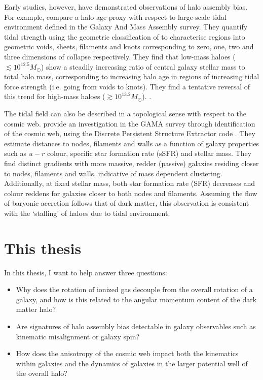 Early studies, however, have demonstrated observations of halo assembly bias. For example, \citet{tojeiro2017} compare a halo age proxy with respect to large-scale tidal environment defined in the Galaxy And Mass Assembly \citep[GAMA;][]{driver2009, driver2011} survey. They quantify tidal strength using the geometric classification of \citet{eardley2015} to characterise regions into geometric voids, sheets, filaments and knots corresponding to zero, one, two and three dimensions of collapse respectively. They find that low-mass haloes ($\lesssim 10^{12.5} M_{\odot}$) show a steadily increasing ratio of central galaxy stellar mass to total halo mass, corresponding to increasing halo age in regions of increasing tidal force strength (i.e. going from voids to knots). They find a tentative reversal of this trend for high-mass haloes ($\gtrsim 10^{13.2} M_{\odot}$). \citep[See][who explicitly look for changes in halo to stellar mass ratio with geometric environment using stacked lensing profiles, but find no significant changes when averaging over halo mass.]{brouwer2016}.

The tidal field can also be described in a topological sense with respect to the cosmic web. \citet{kraljic2018} provide an investigation in the GAMA survey through identification of the cosmic web, using the Discrete Persistent Structure Extractor code \citep[DisPerSE;][]{sousbie2011a,sousbie2011b}.  They estimate distances to nodes, filaments and walls as a function of galaxy properties such as $u - r$ colour, specific star formation rate (sSFR) and stellar mass. They find distinct gradients with more massive, redder (passive) galaxies residing closer to nodes, filaments and walls, indicative of mass dependent clustering. Additionally, at fixed stellar mass, both star formation rate (SFR) decreases and colour reddens for galaxies closer to both nodes and filaments. Assuming the flow of baryonic accretion follows that of dark matter, this observation is consistent with the `stalling' of haloes due to tidal environment.

\section{This thesis}
In this thesis, I want to help answer three questions:

\begin{itemize}
    
    \item Why does the rotation of ionized gas decouple from the overall rotation of a galaxy, and how is this related to the angular momentum content of the dark matter halo?
    
    \item Are signatures of halo assembly bias detectable in galaxy observables such as kinematic misalignment or galaxy spin? 
    
    \item How does the anisotropy of the cosmic web impact both the kinematics within galaxies and the dynamics of galaxies in the larger potential well of the overall halo?
    
\end{itemize}

